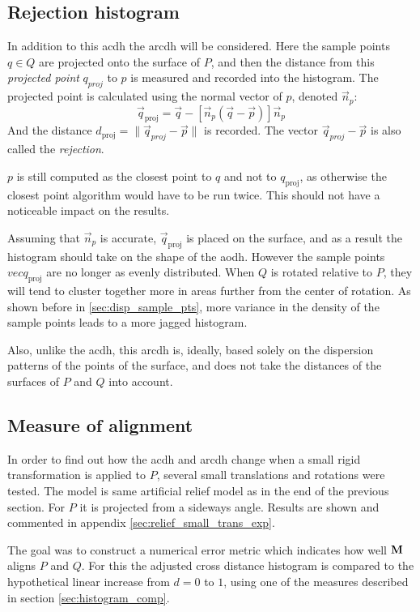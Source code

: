 \subsection{Rejection histogram}
In addition to this \gls{acdh} the \acrfull{arcdh} will be considered. Here the sample points $q \in Q$ are projected onto the surface of $P$, and then the distance from this \emph{projected point} $q_{{proj}}$ to $p$ is measured and recorded into the histogram. The projected point is calculated using the normal vector of $p$, denoted $\vec{n}_p$:
\begin{equation}
\vec{q}_{\text{proj}} = \vec{q} - \left[ \vec{n}_p (\vec{q} - \vec{p}) \right] \vec{n}_p
\end{equation}
And the distance $d_{\text{proj}} = \| \vec{q}_{{proj}} - \vec{p} \|$ is recorded. The vector $\vec{q}_{{proj}} - \vec{p}$ is also called the \emph{rejection}.

$p$ is still computed as the closest point to $q$ and not to $q_{\text{proj}}$, as otherwise the closest point algorithm would have to be run twice. This should not have a noticeable impact on the results.

Assuming that $\vec{n}_p$ is accurate, $\vec{q}_{\text{proj}}$ is placed on the surface, and as a result the histogram should take on the shape of the \gls{aodh}. However the sample points $vec{q}_{\text{proj}}$ are no longer as evenly distributed. When $Q$ is rotated relative to $P$, they will tend to cluster together more in areas further from the center of rotation. As shown before in \ref{sec:disp_sample_pts}, more variance in the density of the sample points leads to a more jagged histogram.

Also, unlike the \gls{acdh}, this \gls{arcdh} is, ideally, based solely on the dispersion patterns of the points of the surface, and does not take the distances of the surfaces of $P$ and $Q$ into account.


\subsection{Measure of alignment}
In order to find out how the \gls{acdh} and \gls{arcdh} change when a small rigid transformation is applied to $P$, several small translations and rotations were tested. The model is same artificial relief model as in the end of the previous section. For $P$ it is projected from a sideways angle. Results are shown and commented in appendix \ref{sec:relief_small_trans_exp}.

The goal was to construct a numerical error metric which indicates how well $\mathbf{M}$ aligns $P$ and $Q$. For this the adjusted cross distance histogram is compared to the hypothetical linear increase from $d = 0$ to $1$, using one of the measures described in section \ref{sec:histogram_comp}.

